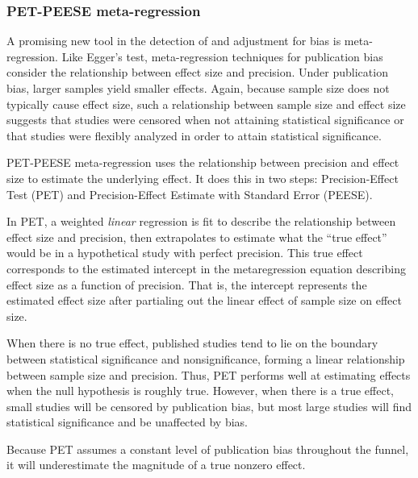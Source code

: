 \documentclass[man]{apa6}
\begin{document}
\subsubsection{PET-PEESE meta-regression}
A promising new tool in the detection of and adjustment for bias is meta-regression. Like Egger's test, meta-regression techniques for publication bias consider the relationship between effect size and precision. Under publication bias, larger samples yield smaller effects. Again, because sample size does not typically cause effect size, such a relationship between sample size and effect size suggests that studies were censored when not attaining statistical significance or that studies were flexibly analyzed in order to attain statistical significance. 

PET-PEESE meta-regression \citep{Stanley:Doucouliagos:2013} %
uses the relationship between precision and effect size to estimate the underlying effect. It does this in two steps: Precision-Effect Test (PET) and Precision-Effect Estimate with Standard Error (PEESE). 

In PET, a weighted {\em linear} regression is fit to describe the relationship between effect size and precision, then extrapolates to estimate what the ``true effect'' would be in a hypothetical study with perfect precision. This true effect corresponds to the estimated intercept in the metaregression equation describing effect size as a function of precision. That is, the intercept represents the estimated effect size after partialing out the linear effect of sample size on effect size.

When there is no true effect, published studies tend to lie on the boundary between statistical significance and nonsignificance, forming a linear relationship between sample size and precision. Thus, PET performs well at estimating effects when the null hypothesis is roughly true. However, when there is a true effect, small studies will be censored by publication bias, but most large studies will find statistical significance and be unaffected by bias. 

Because PET assumes a constant level of publication bias throughout the funnel, it will underestimate the magnitude of a true nonzero effect.
\end{document}
